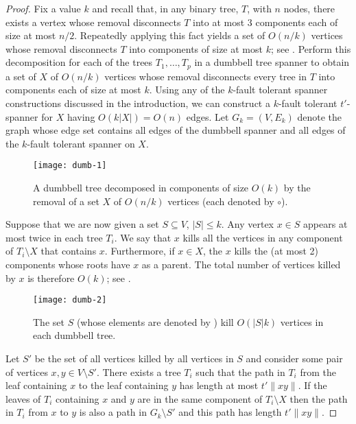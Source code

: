 \documentclass{patmorin}
\begin{document}
\begin{proof} 

Fix a value $k$ and recall that, in any binary tree, $T$, with $n$
nodes, there exists a vertex whose removal disconnects $T$ into at most 3
components each of size at most $n/2$.  Repeatedly applying this
fact yields a set of $O(n/k)$ vertices whose removal disconnects $T$ into
components of size at most $k$; see .  Perform this decomposition for each of
the trees $T_1,\ldots,T_p$ in a dumbbell tree spanner to obtain a set of
$X$ of $O(n/k)$ vertices whose removal disconnects every tree in $T$ into
components each of size at most $k$.  Using any of the $k$-fault tolerant
spanner constructions discussed in the introduction, we can construct
a $k$-fault tolerant $t'$-spanner for $X$ having $O(k|X|)=O(n)$ edges.
Let $G_k=(V,E_k)$ denote the graph whose edge set contains all edges of the
dumbbell spanner and all edges of the $k$-fault tolerant spanner on $X$.

\begin{figure}
\begin{center}
  \texttt{[image: dumb-1]}
\end{center}
\caption{A dumbbell tree decomposed in components of size $O(k)$ by the
removal of a set $X$ of $O(n/k)$ vertices (each denoted by $\circ$).}
\end{figure}

Suppose that we are now given a set $S\subseteq V$, $|S|\le k$.  Any vertex
$x\in S$ appears at most twice in each tree $T_i$.  We say that $x$ kills
all the vertices in any component of $T_i\setminus X$ that contains $x$.
Furthermore, if $x\in X$, the $x$ kills the (at most 2) components whose
roots have $x$ as a parent.  The total number of vertices killed by $x$
is therefore $O(k)$; see .

\begin{figure}
\begin{center}
  \texttt{[image: dumb-2]}
\end{center}
\caption{The set $S$ (whose elements are denoted by \textbullet) kill
$O(|S|k)$ vertices in each dumbbell tree.}
\end{figure}

Let $S'$ be the set of all vertices killed by all vertices in $S$ and
consider some pair of vertices $x,y\in V\setminus S'$.  There exists a
tree $T_i$ such that the path in $T_i$ from the leaf containing $x$ to the
leaf containing $y$ has length at most $t'\|xy\|$.  If the leaves of $T_i$
containing $x$ and $y$ are in the same component of $T_i\setminus X$ then
the path in $T_i$ from $x$ to $y$ is also a path in $G_k\setminus S'$ and
this path has length $t'\|xy\|$.


\end{proof}
\end{document}
